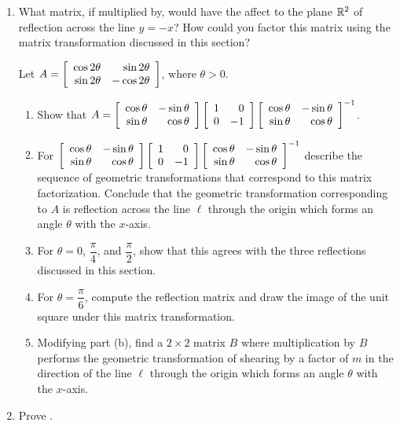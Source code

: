 \begin{enumerate}[!HW!]
\item What matrix, if multiplied by, would have the affect to the plane $\R^2$ of reflection across the line $y=-x$? How could you factor this matrix using the matrix transformation discussed in this section?

\itemspade Let $A = \mtx{rr}{\cos 2\theta & \sin 2\theta \\ \sin 2\theta & -\cos 2\theta}$, where $\theta >0$.
\begin{enumerate}
\item Show that $A = \mtx{rr}{\cos \theta & -\sin \theta \\ \sin \theta & \cos \theta}\mtx{rr}{1 & 0 \\ 0 & -1}\mtx{rr}{\cos \theta & -\sin \theta \\ \sin \theta & \cos \theta}^{-1}$.
\item For $\mtx{rr}{\cos \theta & -\sin \theta \\ \sin \theta & \cos \theta}\mtx{rr}{1 & 0 \\ 0 & -1}\mtx{rr}{\cos \theta & -\sin \theta \\ \sin \theta & \cos \theta}^{-1}$ describe the sequence of geometric transformations that correspond to this matrix factorization. Conclude that the geometric transformation corresponding to $A$ is reflection across the line $\ell$ through the origin which forms an angle $\theta$ with the $x$-axis.
\item For $\theta=0$, $\dfrac{\pi}{4}$, and $\dfrac{\pi}{2}$, show that this agrees with the three reflections discussed in this section.
\item For $\theta = \dfrac{\pi}{6}$, compute the reflection matrix and draw the image of the unit square under this matrix transformation.
\item Modifying part (b), find a $2\times 2$ matrix $B$ where multiplication by $B$ performs the geometric transformation of shearing by a factor of $m$ in the direction of the line $\ell$ through the origin which forms an angle $\theta$ with the $x$-axis.
\end{enumerate}

\item Prove .
\end{enumerate}


 \mbox{}\vfill
 \pagebreak